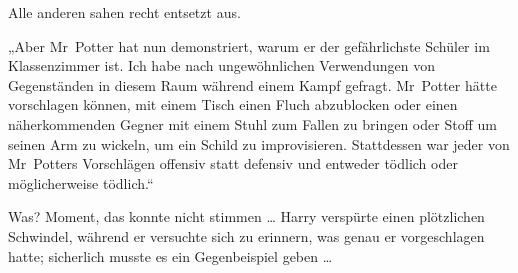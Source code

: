 Alle anderen sahen recht entsetzt aus.

„Aber Mr~Potter hat nun demonstriert, warum er der gefährlichste Schüler im Klassenzimmer ist. Ich habe nach ungewöhnlichen Verwendungen von Gegenständen in diesem Raum während einem Kampf gefragt. Mr~Potter hätte vorschlagen können, mit einem Tisch einen Fluch abzublocken oder einen näherkommenden Gegner mit einem Stuhl zum Fallen zu bringen oder Stoff um seinen Arm zu wickeln, um ein Schild zu improvisieren. Stattdessen war jeder von Mr~Potters Vorschlägen offensiv statt defensiv und entweder tödlich oder möglicherweise tödlich.“

Was? Moment, das konnte nicht stimmen … Harry verspürte einen plötzlichen Schwindel, während er versuchte sich zu erinnern, was genau er vorgeschlagen hatte; sicherlich musste es ein Gegenbeispiel geben …


